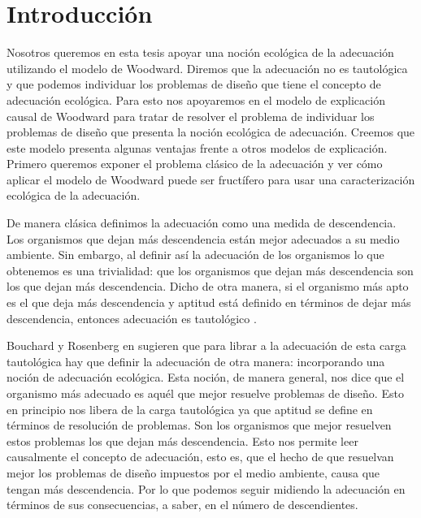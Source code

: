 
\chapter*{Introducción}


\noindent Nosotros queremos en esta tesis apoyar una noción ecológica de la adecuación utilizando el modelo de Woodward. Diremos que la adecuación no es tautológica y que podemos individuar los problemas de diseño que tiene el concepto de adecuación ecológica. Para esto nos apoyaremos en el modelo de explicación causal de Woodward para tratar de resolver el problema de individuar los problemas de diseño que presenta la noción ecológica de adecuación. Creemos que este modelo presenta algunas ventajas frente a otros modelos de explicación. Primero queremos exponer el problema clásico de la adecuación y ver cómo aplicar el modelo de Woodward puede ser fructífero para usar una caracterización ecológica de la adecuación.

De manera clásica definimos la adecuación como una medida de descendencia. Los organismos que dejan más descendencia están mejor adecuados a su medio ambiente. Sin embargo, al definir así la adecuación de los organismos lo que obtenemos es una trivialidad: que los organismos que dejan más descendencia son los que dejan más descendencia. Dicho de otra manera, si el organismo más apto es el que deja más descendencia y aptitud está definido en términos de dejar más descendencia, entonces adecuación es tautológico \cite{Paul1992, sep-fitness}.

Bouchard y Rosenberg en \cite{Bouchard2004} sugieren que para librar a la adecuación de esta carga tautológica hay que definir la adecuación de otra manera: incorporando una noción de adecuación ecológica. Esta noción, de manera general, nos dice que el organismo más adecuado es aquél que mejor resuelve problemas de diseño. Esto en principio nos libera de la carga tautológica ya que aptitud se define en términos de resolución de problemas. Son los organismos que mejor resuelven estos problemas los que dejan más descendencia. Esto nos permite leer causalmente el concepto de adecuación, esto es, que el hecho de que resuelvan mejor los problemas de diseño impuestos por el medio ambiente, causa que tengan más descendencia. Por lo que podemos seguir midiendo la adecuación en términos de sus consecuencias, a saber, en el número de descendientes.

